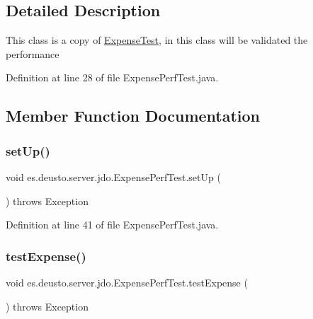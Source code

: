\subsection{Detailed Description}
This class is a copy of \hyperlink{classes_1_1deusto_1_1server_1_1jdo_1_1_expense_test}{Expense\+Test}, in this class will be validated the performance 

Definition at line 28 of file Expense\+Perf\+Test.\+java.



\subsection{Member Function Documentation}
\mbox{\label{classes_1_1deusto_1_1server_1_1jdo_1_1_expense_perf_test_a0e502f9886deb99f4b0ba6b31a546996}} 
\subsubsection{\texorpdfstring{set\+Up()}{setUp()}}
{\footnotesize\ttfamily void es.\+deusto.\+server.\+jdo.\+Expense\+Perf\+Test.\+set\+Up (\begin{DoxyParamCaption}{ }\end{DoxyParamCaption}) throws Exception}



Definition at line 41 of file Expense\+Perf\+Test.\+java.

\mbox{\label{classes_1_1deusto_1_1server_1_1jdo_1_1_expense_perf_test_ae31bef49b4d03ba25a303945ffadedad}} 
\subsubsection{\texorpdfstring{test\+Expense()}{testExpense()}}
{\footnotesize\ttfamily void es.\+deusto.\+server.\+jdo.\+Expense\+Perf\+Test.\+test\+Expense (\begin{DoxyParamCaption}{ }\end{DoxyParamCaption}) throws Exception}




